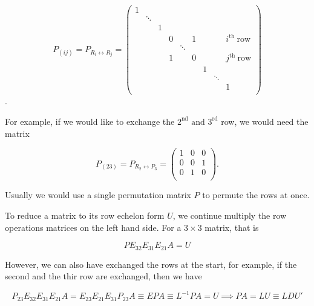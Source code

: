 \documentclass[a4paper,12pt]{report}
\begin{document}
\begin{equation}
    P_{(ij)} =  P_{R_{i} \leftrightarrow R_{j}  } = \begin{pmatrix}
        1 &  &  &  &  &  &  &  &   \\
         & \ddots  &  &  &  &  &  &  &   \\
         &  & 1 &  &  &  &  &  &   \\
         &  &  & 0 &  & 1 &  &  & i^{\text{th }}\text{row}    \\
         &  &  &  & \ddots  &  &  &  &   \\
         &  &  & 1 &  & 0 &  &  & j^{\text{th }}\text{row}   \\
         &  &  &  &  &  & 1 &  &   \\
         &  &  &  &  &  &  & \ddots  &   \\
         &  &  &  &  &  &  &  &  1 \\
    \end{pmatrix}
\end{equation}. 

For example, if we would like to exchange the \(2^{\text{nd}} \text { and } 3^{\text{rd}}\) row, we would need the matrix 

\begin{equation}
    P_{(23)} = P_{R_{2} \leftrightarrow P_{3}  } = \begin{pmatrix}
        1 & 0 &  0 \\
        0 & 0 &  1 \\
        0 & 1 &  0 \\
    \end{pmatrix}.
\end{equation}

Usually we would use a single permutation matrix \(P\) to permute the rows at once.

To reduce a matrix to its row echelon form \(U\), we continue multiply the row operations matrices on the left hand side. For a \(3 \times 3\) matrix, that is 

\begin{equation}
    PE_{32}E_{31}E_{21}A = U
\end{equation}

However, we can also have exchanged the rows at the start, for example, if the second and the thir row are exchanged, then we have 

\begin{equation}
    P_{23}E_{32}E_{31}E_{21}A = E_{23}E_{21}E_{31}P_{23}A \equiv EPA \equiv L^{-1} PA = U \implies PA=LU \equiv LDU'     
\end{equation}
\end{document}
